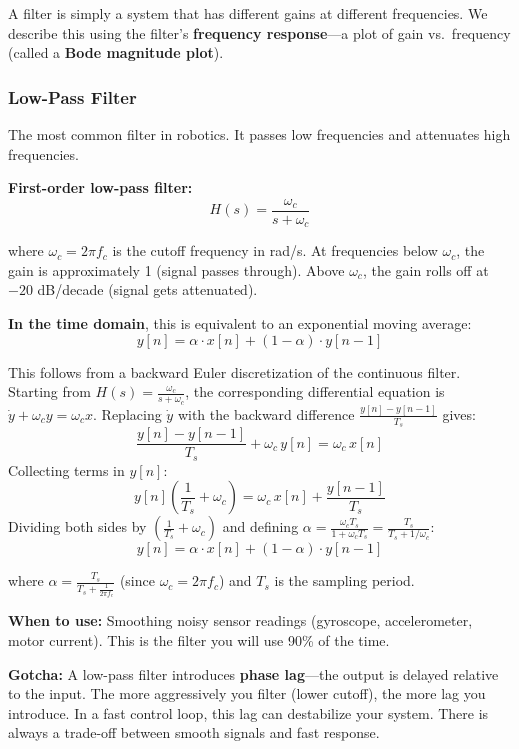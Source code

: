 A filter is simply a system that has different gains at different frequencies. We describe this using the filter's \textbf{frequency response}---a plot of gain vs.\ frequency (called a \textbf{Bode magnitude plot}).

\subsubsection{Low-Pass Filter}

The most common filter in robotics. It passes low frequencies and attenuates high frequencies.

\textbf{First-order low-pass filter:}
\begin{equation}
H(s) = \frac{\omega_c}{s + \omega_c}
\end{equation}

where $\omega_c = 2\pi f_c$ is the cutoff frequency in rad/s. At frequencies below $\omega_c$, the gain is approximately 1 (signal passes through). Above $\omega_c$, the gain rolls off at $-20$ dB/decade (signal gets attenuated).

\textbf{In the time domain}, this is equivalent to an exponential moving average:
\begin{equation}
y[n] = \alpha \cdot x[n] + (1 - \alpha) \cdot y[n-1]
\end{equation}

This follows from a backward Euler discretization of the continuous filter. Starting from $H(s) = \frac{\omega_c}{s + \omega_c}$, the corresponding differential equation is $\dot{y} + \omega_c y = \omega_c x$. Replacing $\dot{y}$ with the backward difference $\frac{y[n] - y[n-1]}{T_s}$ gives:
\[
\frac{y[n] - y[n-1]}{T_s} + \omega_c\, y[n] = \omega_c\, x[n]
\]
Collecting terms in $y[n]$:
\[
y[n]\!\left(\frac{1}{T_s} + \omega_c\right) = \omega_c\, x[n] + \frac{y[n-1]}{T_s}
\]
Dividing both sides by $\left(\frac{1}{T_s} + \omega_c\right)$ and defining $\alpha = \frac{\omega_c T_s}{1 + \omega_c T_s} = \frac{T_s}{T_s + 1/\omega_c}$:
\[
y[n] = \alpha \cdot x[n] + (1 - \alpha) \cdot y[n-1]
\]

where $\alpha = \frac{T_s}{T_s + \frac{1}{2\pi f_c}}$ (since $\omega_c = 2\pi f_c$) and $T_s$ is the sampling period.

\textbf{When to use:} Smoothing noisy sensor readings (gyroscope, accelerometer, motor current). This is the filter you will use 90\% of the time.

\textbf{Gotcha:} A low-pass filter introduces \textbf{phase lag}---the output is delayed relative to the input. The more aggressively you filter (lower cutoff), the more lag you introduce. In a fast control loop, this lag can destabilize your system. There is always a trade-off between smooth signals and fast response.

